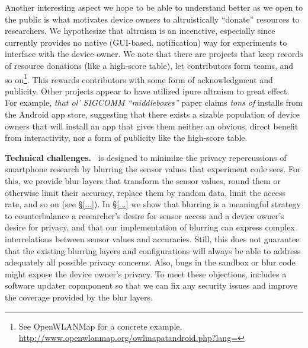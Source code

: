Another interesting aspect we hope to be able to understand better as 
we open \sysname to the public is what motivates device 
owners to altruistically ``donate'' resources to researchers. 
We hypothesize that altruism is an incenctive, especially since 
\sysname currently provides no native (GUI-based, 
notification) way for experiments to interface with the device 
owner. We note that there are projects that keep records of 
resource donations (like a high-score table), let contributors form 
teams, and so on\footnote{See OpenWLANMap for a concrete example, \url{http://www.openwlanmap.org/owlmapatandroid.php?lang=}}.
This rewards contributors with some form of acknowledgment and 
publicity.
Other projects appear to have utilized ipure altruism to great effect.
For example, \textit{that ol' SIGCOMM ``middleboxes''} paper 
\cite{it} claims \textit{tons of} installs from the Android app 
store, suggesting that there exists a sizable population of device 
owners that will install an app that gives them neither an obvious, 
direct benefit from interactivity, nor a form of publicity like 
the high-score table.


\textbf{Technical challenges.}~
\sysname is designed to minimize the privacy repercussions 
of smartphone research by blurring the sensor values that experiment 
code sees. For this, we provide blur layers that transform the sensor 
values, round them or otherwise limit their accuracy, replace them by 
random data, limit the access rate, and so on (see \S\ref{...}). 
In \S\ref{...} we show that blurring is a meaningful strategy to 
counterbalance a researcher's desire for sensor access and a device 
owner's desire for privacy, and that our implementation of blurring 
can express complex interrelations between sensor values and accuracies. 
Still, this does not guarantee that the existing blurring layers and 
configurations will always be able to address adequately all possible 
privacy concerns. Also, bugs in the sandbox or blur code might 
expose the device owner's privacy.  
To meet these objections, \sysname includes a software 
updater copmponent so that we can fix any security issues and 
improve the coverage provided by the blur layers.


